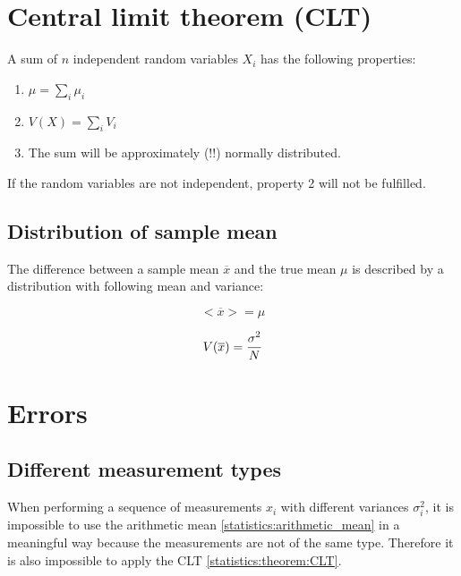 {{\section{Central limit theorem (CLT)}
    \begin{theorem}
    	\label{statistics:theorem:CLT}
		A sum of $n$ independent random variables $X_i$ has the following properties:
        \begin{enumerate}
			\item $\mu = \sum_i\mu_i$
            \item $V(X) = \sum_iV_i$
            \item The sum will be approximately (!!) normally distributed. 
		\end{enumerate}
	\end{theorem}
    \begin{remark}
		If the random variables are not independent, property 2 will not be fulfilled.
	\end{remark}

\subsection{Distribution of sample mean}
	The difference between a sample mean $\overline{x}$ and the true mean $\mu$ is described by a distribution with following mean and variance:
	\begin{property}
		\begin{equation}
			<\overline{x}> = \mu
		\end{equation}
	\end{property}
    \begin{property}
		\begin{equation}
        	\label{statistics:variance_sample_mean}
			V(\overline{x}) = \stylefrac{\sigma^2}{N}
		\end{equation}
	\end{property}
    
\section{Errors}

\subsection{Different measurement types}
	When performing a sequence of measurements $x_i$ with different variances $\sigma_i^2$, it is impossible to use the arithmetic mean \ref{statistics:arithmetic_mean} in a meaningful way because the measurements are not of the same type. Therefore it is also impossible to apply the CLT \ref{statistics:theorem:CLT}.
	
}}
